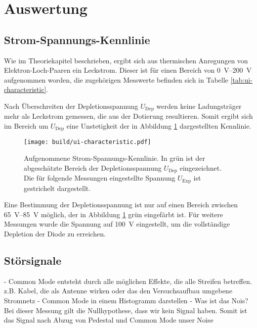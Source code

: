 \newpage
\section{Auswertung}
\label{sec:Auswertung}

\subsection{Strom-Spannungs-Kennlinie}
\label{sec:UI-Auswerung}

Wie im Theoriekapitel %
beschrieben, ergibt sich aus thermischen Anregungen von Elektron-Loch-Paaren
ein Leckstrom.
Dieser ist für einen Bereich von \SIrange{0}{200}{\volt} aufgenommen worden,
die zugehörigen Messwerte befinden sich in Tabelle \ref{tab:ui-characteristic}.

Nach Überschreiten der Depletionsspannung $U_\text{Dep}$ werden keine Ladungsträger mehr als
Leckstrom gemessen, die aus der Dotierung resultieren.
Somit ergibt sich im Bereich um $U_\text{Dep}$ eine Unstetigkeit der in
Abbildung \ref{fig:ui-characteristic} dargestellten Kennlinie.
\begin{figure}
  \centering
  \texttt{[image: build/ui-characteristic.pdf]}  %
  \caption{Aufgenommene Strom-Spannungs-Kennlinie.
  In grün ist der abgeschätzte Bereich der Depletionsspannung $U_\text{Dep}$ eingezeichnet.
  Die für folgende Messungen eingestellte Spannung $U_\text{Exp}$ ist gestrichelt dargestellt.}
  \label{fig:ui-characteristic}
\end{figure}
Eine Bestimmung der Depletionsspannung ist nur auf einen Bereich zwischen
\SIrange[range-phrase={\text{ und }}]{65}{85}{\volt}
möglich, der in Abbildung \ref{fig:ui-characteristic} grün eingefärbt ist.
Für weitere Messungen wurde die Spannung auf \SI{100}{\volt} eingestellt, um
die vollständige Depletion der Diode zu erreichen.

\FloatBarrier
\subsection{Störsignale}
\label{sec:Stoersignale-Auswertung}

- Common Mode entsteht durch alle möglichen Effekte, die alle Streifen betreffen.
z.B. Kabel, die als Antenne wirken oder das den Versuchsaufbau umgebene Stromnetz
- Common Mode in einem Histogramm darstellen
- Was ist das Nois? Bei dieser Messung gilt die Nullhypothese, dass wir kein Signal haben.
Somit ist das Signal nach Abzug von Pedestal und Common Mode unser Noise

